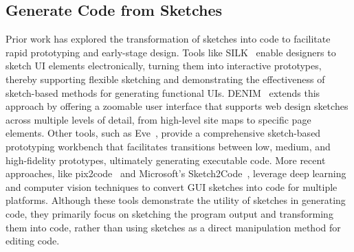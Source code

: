\subsection{Generate Code from Sketches}
\label{sec:sketch-to-code}
Prior work has explored the transformation of sketches into code to facilitate rapid prototyping and early-stage design. Tools like SILK~\cite{landay1995interactive, 910894} enable designers to sketch UI elements electronically, turning them into interactive prototypes, thereby supporting flexible sketching and demonstrating the effectiveness of sketch-based methods for generating functional UIs. DENIM~\cite{10.1145/332040.332486} extends this approach by offering a zoomable user interface that supports web design sketches across multiple levels of detail, from high-level site maps to specific page elements.
Other tools, such as Eve~\cite{10.1145/3290607.3312994}, provide a comprehensive sketch-based prototyping workbench that facilitates transitions between low, medium, and high-fidelity prototypes, ultimately generating executable code. More recent approaches, like pix2code~\cite{10.1145/3220134.3220135} and Microsoft's Sketch2Code~\cite{microsoft_sketch2code}, leverage deep learning and computer vision techniques to convert GUI sketches into code for multiple platforms. Although these tools demonstrate the utility of sketches in generating code, they primarily focus on sketching the program output and transforming them into code, rather than using sketches as a direct manipulation method for editing code.

